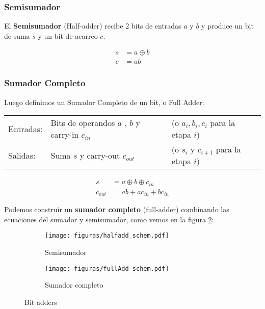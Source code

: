 \subsubsection{Semisumador}
El {\bf Semisumador} (Half-adder) recibe 2 bits de entradas \(a\) y \(b\) y produce un bit de suma \(s\) y un bit de acarreo \(c\).

\begin{subequations}
\begin{align}
s &= a \oplus b\\
c &= ab
\end{align}
\end{subequations}

\subsubsection{Sumador Completo}
Luego definimos un Sumador Completo de un bit, o Full Adder:
\begin{center}
\begin{tabular}{lll}
Entradas: & Bits de operandos \(a\) , \(b\) y carry-in \(c_{in}\) & (o \(a_i, b_i, c_i\) para la etapa \(i\)) \\
Salidas: & Suma \(s\) y carry-out \(c_{out}\) & (o \(s_i\) y \(c_{i+1}\) para la etapa \(i\)) \\
\end{tabular}
\end{center}

\begin{subequations}
\begin{align}
s &= a\oplus b \oplus c_{in}
\label{s}
\\
c_{out}&= a b + a c_{in} + b c_{in}
\label{c}
\end{align}
\end{subequations}

Podemos construir un {\bf sumador completo} (full-adder) combinando las ecuaciones del sumador y semisumador, como vemos en la figura \ref{fig:fulladder}:

\vspace{-1pt}

\begin{figure}[h]
  \centering
\hspace{-23pt}
\begin{subfigure}[b]{0.3\textwidth}
                \centering
                \texttt{[image: figuras/halfadd\_schem.pdf]}
                \caption{Semisumador}
                \label{fig:halfadder}
        \end{subfigure}
\begin{subfigure}[b]{0.5\textwidth}
                \centering
                \texttt{[image: figuras/fullAdd\_schem.pdf]}
                \caption{Sumador completo}
                \label{fig:fulladder}
        \end{subfigure}

  \caption{Bit adders}\label{fig:bitadders}

\end{figure}

